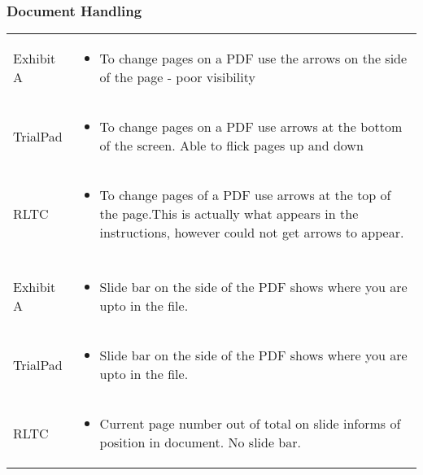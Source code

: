 \subsubsection{Document Handling}
\singlespace
\begin{center}
    

\begin{tabular}{|p{2cm}|p{10cm}|}
\hline
\rowcolor{lightgrey}\multicolumn{2}{|c|}{Page Turning}\\
\hline
Exhibit A & \begin{itemize}
    \item To change pages on a PDF use the arrows on the side of the page - poor visibility
\end{itemize}\\
\hline
TrialPad & \begin{itemize}
    \item To change pages on a PDF use arrows at the bottom of the screen. Able to flick pages up and down
\end{itemize}\\
\hline
RLTC & \begin{itemize}
    \item To change pages of a PDF use arrows at the top of the page.This is actually what appears in the instructions, however could not get arrows to appear.
 
\end{itemize}\\
\hline
\rowcolor{lightgrey}\multicolumn{2}{|c|}{Page Navigation}\\
\hline
Exhibit A & \begin{itemize}
    \item Slide bar on the side of the PDF shows where you are upto in the file.
\end{itemize}\\
\hline
TrialPad & \begin{itemize}
    \item Slide bar on the side of the PDF shows where you are upto in the file.
\end{itemize}\\
\hline
RLTC & \begin{itemize}
    \item Current page number out of total on slide informs of position in document. No slide bar.
\end{itemize}\\
\hline
\end{tabular}
\end{center}
